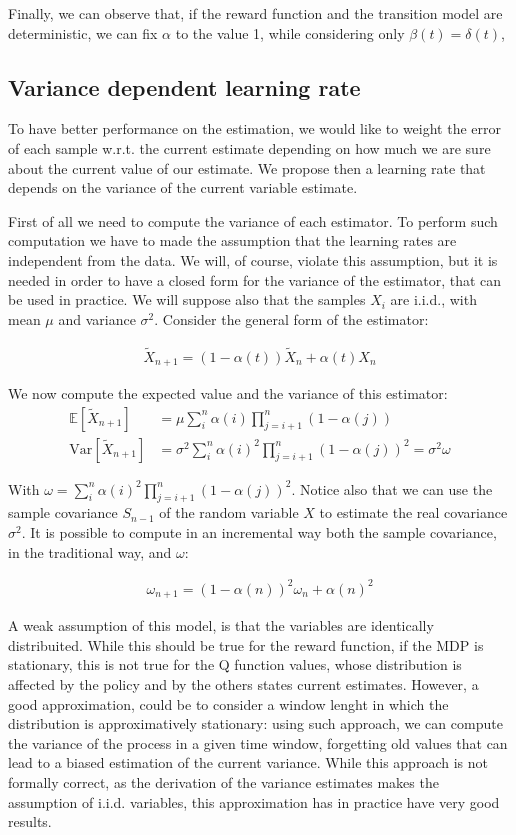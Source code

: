 \documentclass[conference]{IEEEtran}
\begin{document}
Finally, we can observe that, if the reward function and the transition model are deterministic, we can fix $\alpha$ to the value 1, while considering only $\beta(t)=\delta(t)$,

\subsection{Variance dependent learning rate}
To have better performance on the estimation, we would like to weight the error of each sample w.r.t. the current estimate depending on how much we are sure about the current value of our estimate. We propose then a learning rate that depends on the variance of the current variable estimate.

First of all we need to compute the variance of each estimator. To perform such computation we have to made the assumption that the learning rates are independent from the data. We will, of course, violate this assumption, but it is needed in order to have a closed form for the variance of the estimator, that can be used in practice. We will suppose also that the samples $X_i$ are i.i.d., with mean $\mu$ and variance $\sigma^2$. Consider the general form of the estimator:

\begin{align}
 \widetilde{X}_{n+1} = (1-\alpha(t))\widetilde{X}_{n}+\alpha(t)X_{n}
\end{align}

We now compute the expected value and the variance of this estimator:
\begin{align}
 \mathbb{E}\left[\widetilde{X}_{n+1}\right]& = \mu\sum_i^n \alpha(i) \prod_{j=i+1}^{n} \left(1-\alpha(j)\right)\\
 \mathrm{Var}\left[\widetilde{X}_{n+1}\right]& = \sigma^2\sum_i^n \alpha(i)^2 \prod_{j=i+1}^{n} \left(1-\alpha(j)\right)^2 = \sigma^2\omega
\end{align}

With $\omega=\sum_i^n \alpha(i)^2 \prod_{j=i+1}^{n} \left(1-\alpha(j)\right)^2$. Notice also that we can use the sample covariance $S_{n-1}$ of the random variable $X$ to estimate the real covariance $\sigma^2$. It is possible to compute in an incremental way both the sample covariance, in the traditional way, and $\omega$:

\begin{align}
 \omega_{n+1}=(1-\alpha(n))^2\omega_n+\alpha(n)^2
\end{align}

A weak assumption of this model, is that the variables are identically distribuited. While this should be true for the reward function, if the MDP is stationary, this is not true for the Q function values, whose distribution is affected by the policy and by the others states current estimates. However, a good approximation, could be to consider a window lenght in which the distribution is approximatively stationary: using such approach, we can compute the variance of the process in a given time window, forgetting old values that can lead to a biased estimation of the current variance. While this approach is not formally correct, as the derivation of the variance estimates makes the assumption of i.i.d. variables, this approximation has in practice have very good results.
\end{document}
